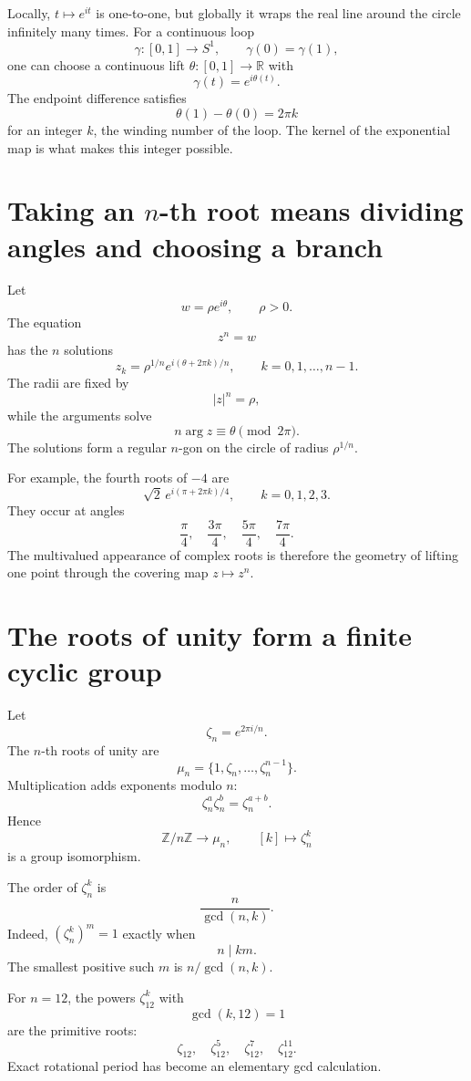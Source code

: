 Locally, \(t\mapsto e^{it}\) is one-to-one, but globally it wraps the real line around the circle infinitely many times.  For a continuous loop
\[
  \gamma:[0,1]\to S^1,
  \qquad
  \gamma(0)=\gamma(1),
\]
one can choose a continuous lift \(\theta:[0,1]\to\mathbb R\) with
\[
  \gamma(t)=e^{i\theta(t)}.
\]
The endpoint difference satisfies
\[
  \theta(1)-\theta(0)=2\pi k
\]
for an integer \(k\), the winding number of the loop.  The kernel of the exponential map is what makes this integer possible.

\section{Taking an \texorpdfstring{$n$}{n}-th root means dividing angles and choosing a branch}

Let
\[
  w=\rho e^{i\theta},
  \qquad \rho>0.
\]
The equation
\[
  z^n=w
\]
has the \(n\) solutions
\[
  z_k=\rho^{1/n}
  e^{i(\theta+2\pi k)/n},
  \qquad
  k=0,1,\ldots,n-1.
\]
The radii are fixed by
\[
  |z|^n=\rho,
\]
while the arguments solve
\[
  n\arg z\equiv\theta\pmod{2\pi}.
\]
The solutions form a regular \(n\)-gon on the circle of radius \(\rho^{1/n}\).

For example, the fourth roots of \(-4\) are
\[
  \sqrt2\,
  e^{i(\pi+2\pi k)/4},
  \qquad k=0,1,2,3.
\]
They occur at angles
\[
  \frac\pi4,
  \quad
  \frac{3\pi}4,
  \quad
  \frac{5\pi}4,
  \quad
  \frac{7\pi}4.
\]
The multivalued appearance of complex roots is therefore the geometry of lifting one point through the covering map \(z\mapsto z^n\).

\section{The roots of unity form a finite cyclic group}

Let
\[
  \zeta_n=e^{2\pi i/n}.
\]
The \(n\)-th roots of unity are
\[
  \mu_n=\{1,\zeta_n,\ldots,\zeta_n^{n-1}\}.
\]
Multiplication adds exponents modulo \(n\):
\[
  \zeta_n^a\zeta_n^b
  =\zeta_n^{a+b}.
\]
Hence
\[
  \boxed{
  \mathbb Z/n\mathbb Z\longrightarrow\mu_n,
  \qquad
  [k]\longmapsto\zeta_n^k}
\]
is a group isomorphism.

The order of \(\zeta_n^k\) is
\[
  \frac n{\gcd(n,k)}.
\]
Indeed, \((\zeta_n^k)^m=1\) exactly when
\[
  n\mid km.
\]
The smallest positive such \(m\) is \(n/\gcd(n,k)\).

For \(n=12\), the powers \(\zeta_{12}^k\) with
\[
  \gcd(k,12)=1
\]
are the primitive roots:
\[
  \zeta_{12},
  \quad
  \zeta_{12}^5,
  \quad
  \zeta_{12}^7,
  \quad
  \zeta_{12}^{11}.
\]
Exact rotational period has become an elementary gcd calculation.

